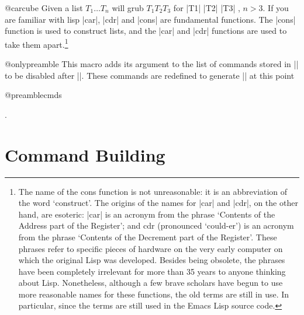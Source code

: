 \begin{docCommand}{@carcube}{}
Given a list $T_1\dots T_n$ \cmd{\@carcube} will grub $T_1 T_2 T_3$ for |T1| |T2| |T3| , $n > 3$. If you are familiar with
lisp |car|, |cdr| and |cons| are fundamental functions. The |cons|  function is used to construct lists, and the |car|
 and |cdr| functions are used to take them apart.\footnote{The name of the cons function is not unreasonable: it is an abbreviation of the word `construct'. The origins of the names for |car| and |cdr|, on the other hand, are esoteric: |car| is an acronym from 
 the phrase `Contents of the Address part of the Register'; and cdr (pronounced `could-er') is an acronym from the phrase 
 `Contents of the Decrement part of the Register'. These phrases refer to specific pieces of hardware on 
 the very early computer on which the original Lisp was developed. Besides being obsolete, the phrases have been completely irrelevant for more than 35 years to anyone thinking about Lisp. Nonetheless, although a few brave scholars have begun to 
 use more reasonable names for these functions, the old terms are still in use. In particular, since the terms 
 are still used in the Emacs Lisp source code.}
\end{docCommand}



\begin{docCommand}{@onlypreamble}{}
    This macro adds its argument to the list of commands stored in
    |\@preamblecmds| to be
    disabled after ||. These commands are redefined
    to generate |\@notprerr| at this point
\end{docCommand}
\begin{docCommand}{@preamblecmds}{}
\end{docCommand}

.
    
\begin{teX}
\def\@preamblecmds{}
\def\@onlypreamble#1{%
  \expandafter\gdef\expandafter\@preamblecmds\expandafter{%
       \@preamblecmds\do#1}}
       
\@onlypreamble\@onlypreamble
\@onlypreamble\@preamblecmds
\end{teX}


\section{Command Building}

